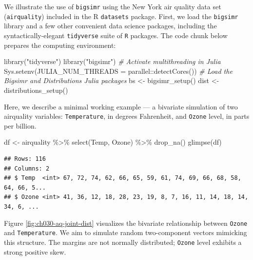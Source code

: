 \documentclass{article}
\newenvironment{Shaded}{\begin{snugshade}}{\end{snugshade}}
\newcommand{\AttributeTok}[1]{\textcolor[rgb]{0.77,0.63,0.00}{#1}}
\newcommand{\CommentTok}[1]{\textcolor[rgb]{0.56,0.35,0.01}{\textit{#1}}}
\newcommand{\FunctionTok}[1]{\textcolor[rgb]{0.00,0.00,0.00}{#1}}
\newcommand{\NormalTok}[1]{#1}
\newcommand{\OtherTok}[1]{\textcolor[rgb]{0.56,0.35,0.01}{#1}}
\newcommand{\SpecialCharTok}[1]{\textcolor[rgb]{0.00,0.00,0.00}{#1}}
\newcommand{\StringTok}[1]{\textcolor[rgb]{0.31,0.60,0.02}{#1}}
\begin{document}
We illustrate the use of \texttt{bigsimr} using the New York air quality
data set (\texttt{airquality}) included in the R \texttt{datasets}
package. First, we load the \texttt{bigsimr} library and a few other
convenient data science packages, including the syntactically-elegant
\texttt{tidyverse} suite of \texttt{R} packages. The code chunk below
prepares the computing environment:

\begin{Shaded}
\begin{Highlighting}[]
\FunctionTok{library}\NormalTok{(}\StringTok{"tidyverse"}\NormalTok{)}
\FunctionTok{library}\NormalTok{(}\StringTok{"bigsimr"}\NormalTok{)}
\CommentTok{\# Activate multithreading in Julia}
\FunctionTok{Sys.setenv}\NormalTok{(}\AttributeTok{JULIA\_NUM\_THREADS =}\NormalTok{ parallel}\SpecialCharTok{::}\FunctionTok{detectCores}\NormalTok{())}
\CommentTok{\# Load the Bigsimr and Distributions Julia packages}
\NormalTok{bs }\OtherTok{\textless{}{-}} \FunctionTok{bigsimr\_setup}\NormalTok{()}
\NormalTok{dist }\OtherTok{\textless{}{-}} \FunctionTok{distributions\_setup}\NormalTok{()}
\end{Highlighting}
\end{Shaded}

Here, we describe a minimal working example --- a bivariate simulation
of two airquality variables: \texttt{Temperature}, in degrees
Fahrenheit, and \texttt{Ozone} level, in parts per billion.

\begin{Shaded}
\begin{Highlighting}[]
\NormalTok{df }\OtherTok{\textless{}{-}}\NormalTok{ airquality }\SpecialCharTok{\%\textgreater{}\%} \FunctionTok{select}\NormalTok{(Temp, Ozone) }\SpecialCharTok{\%\textgreater{}\%} \FunctionTok{drop\_na}\NormalTok{()}
\FunctionTok{glimpse}\NormalTok{(df)}
\end{Highlighting}
\end{Shaded}

\begin{verbatim}
## Rows: 116
## Columns: 2
## $ Temp  <int> 67, 72, 74, 62, 66, 65, 59, 61, 74, 69, 66, 68, 58, 64, 66, 5...
## $ Ozone <int> 41, 36, 12, 18, 28, 23, 19, 8, 7, 16, 11, 14, 18, 14, 34, 6, ...
\end{verbatim}

Figure \ref{fig:ch030-aq-joint-dist} visualizes the bivariate
relationship between \texttt{Ozone} and \texttt{Temperature}. We aim to
simulate random two-component vectors mimicking this structure. The
margins are not normally distributed; \texttt{Ozone} level exhibits a
strong positive skew.
\end{document}
